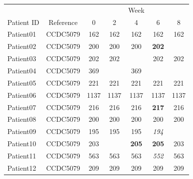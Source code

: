 \documentclass[12pt, oneside]{article}   	%
\begin{document}
\begin{table}[H]
   \centering
   \begin{tabular}{@{} lcccccc @{}} %
      \toprule
       &  &  &  &  Week & & \\
      \cmidrule(l){3-7} %
      Patient ID    & Reference & 0 & 2 & 4 & 6 & 8 \\
      \midrule
      Patient01 & CCDC5079 & 162 & 162 & 162 & 162 & 162 \\
      Patient02 & CCDC5079 & 200 & 200 & 200 & \textbf{202} &  \\
      Patient03 & CCDC5079 & 202 & 202 &  & 202 & 202 \\
      Patient04 & CCDC5079 & 369 &  & 369 &  & \\
      Patient05 & CCDC5079 & 221 & 221 & 221 & 221 & 221 \\
      Patient06 & CCDC5079 & 1137 & 1137 & 1137 & 1137 & 1137 \\
      Patient07 & CCDC5079 & 216 & 216 & 216 & \textbf{217} & 216 \\
      Patient08 & CCDC5079 & 200 & 200 & 200 & 200 & 200 \\
      Patient09 & CCDC5079 & 195 & 195 & 195 & \textsl{194} &  \\
      Patient10 & CCDC5079 & 203 &  & \textbf{205} &\textbf{205} & 203 \\
      Patient11 & CCDC5079 & 563 & 563 & 563 & \textsl{552} & 563 \\
      Patient12 & CCDC5079 & 209 & 209 & 209 & 209 & 209 \\
      \bottomrule
   \end{tabular}
\label{tab:fsnps}
\end{table}
\end{document}
